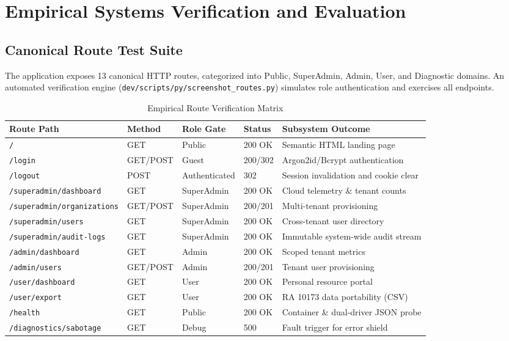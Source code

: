\section{Empirical Systems Verification and Evaluation}

\subsection{Canonical Route Test Suite}
The application exposes 13 canonical HTTP routes, categorized into Public, SuperAdmin, Admin, User, and Diagnostic domains. An automated verification engine (\texttt{dev/scripts/py/screenshot\_routes.py}) simulates role authentication and exercises all endpoints.

\begin{table}[h]
\centering
\caption{Empirical Route Verification Matrix}
\label{tab:routes}
\small
\begin{tabularx}{\textwidth}{llllX}
\toprule
\textbf{Route Path} & \textbf{Method} & \textbf{Role Gate} & \textbf{Status} & \textbf{Subsystem Outcome} \\
\midrule
\texttt{/} & GET & Public & 200 OK & Semantic HTML landing page \\
\texttt{/login} & GET/POST & Guest & 200/302 & Argon2id/Bcrypt authentication \\
\texttt{/logout} & POST & Authenticated & 302 & Session invalidation and cookie clear \\
\texttt{/superadmin/dashboard} & GET & SuperAdmin & 200 OK & Cloud telemetry \& tenant counts \\
\texttt{/superadmin/organizations} & GET/POST & SuperAdmin & 200/201 & Multi-tenant provisioning \\
\texttt{/superadmin/users} & GET & SuperAdmin & 200 OK & Cross-tenant user directory \\
\texttt{/superadmin/audit-logs} & GET & SuperAdmin & 200 OK & Immutable system-wide audit stream \\
\texttt{/admin/dashboard} & GET & Admin & 200 OK & Scoped tenant metrics \\
\texttt{/admin/users} & GET/POST & Admin & 200/201 & Tenant user provisioning \\
\texttt{/user/dashboard} & GET & User & 200 OK & Personal resource portal \\
\texttt{/user/export} & GET & User & 200 OK & RA 10173 data portability (CSV) \\
\texttt{/health} & GET & Public & 200 OK & Container \& dual-driver JSON probe \\
\texttt{/diagnostics/sabotage} & GET & Debug & 500 & Fault trigger for error shield \\
\bottomrule
\end{tabularx}
\end{table}


